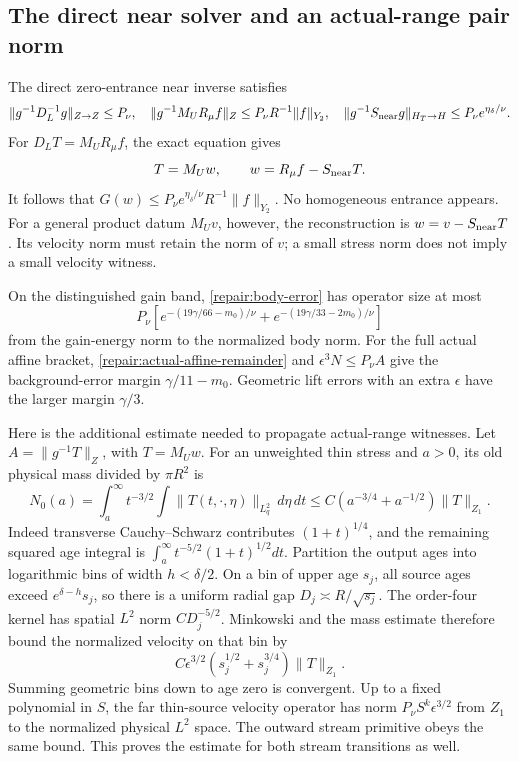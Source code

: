 \subsection{The direct near solver and an actual-range pair norm}

The direct zero-entrance near inverse satisfies
\[
 \|g^{-1}D_L^{-1}g\|_{Z\to Z}\le P_\nu,
 \quad
 \|g^{-1}M_UR_\mu f\|_Z\le P_\nu R^{-1}\|f\|_{Y_2},
 \quad
 \|g^{-1}S_{\rm near}g\|_{H_T\to H}
       \le P_\nu e^{\eta_\delta/\nu}.
\]
For $D_LT=M_UR_\mu f$, the exact equation gives
\[
 T=M_Uw,\qquad w=R_\mu f-S_{\rm near}T.
\]
It follows that $G(w)\le P_\nu e^{\eta_\delta/\nu}
R^{-1}\|f\|_{Y_2}$. No homogeneous entrance appears. For a general
product datum $M_Uv$, however, the reconstruction is
$w=v-S_{\rm near}T$. Its velocity norm must retain the norm of $v$;
a small stress norm does not imply a small velocity witness.

On the distinguished gain band, \eqref{repair:body-error} has
operator size at most
\[
 P_\nu\left[e^{-(19\gamma/66-m_0)/\nu}
             +e^{-(19\gamma/33-2m_0)/\nu}\right]
\]
from the gain-energy norm to the normalized body norm. For the full
actual affine bracket, \eqref{repair:actual-affine-remainder} and
$\epsilon^3N\le P_\nu A$ give the background-error margin
$\gamma/11-m_0$. Geometric lift errors with an extra $\epsilon$
have the larger margin $\gamma/3$.

Here is the additional estimate needed to propagate actual-range
witnesses. Let $A=\|g^{-1}T\|_Z$, with $T=M_Uw$. For an unweighted
thin stress and $a>0$, its old physical mass divided by $\pi R^2$ is
\[
 N_0(a)=\int_a^\infty t^{-3/2}\int\|T(t,\cdot,\eta)\|_{L^2_q}
                  \,d\eta\,dt
 \le C(a^{-3/4}+a^{-1/2})\|T\|_{Z_1}.
\]
Indeed transverse Cauchy--Schwarz contributes $(1+t)^{1/4}$,
and the remaining squared age integral is
$\int_a^\infty t^{-5/2}(1+t)^{1/2}dt$. Partition the output ages
into logarithmic bins of width $h<\delta/2$. On a bin of upper age
$s_j$, all source ages exceed $e^{\delta-h}s_j$, so there is a
uniform radial gap $D_j\asymp R/\sqrt{s_j}$. The order-four
kernel has spatial $L^2$ norm $CD_j^{-5/2}$. Minkowski and the
mass estimate therefore bound the normalized velocity on that bin by
\[
 C\epsilon^{3/2}(s_j^{1/2}+s_j^{3/4})\|T\|_{Z_1}.
\]
Summing geometric bins down to age zero is convergent. Up to a fixed
polynomial in $S$, the far thin-source velocity operator has norm
$P_\nu S^k\epsilon^{3/2}$ from $Z_1$ to the normalized physical
$L^2$ space. The outward stream primitive obeys the same bound.
This proves the estimate for both stream transitions as well.


